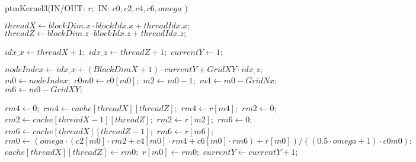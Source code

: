 \documentclass{article}
\begin{document}
	
	\begin{algorithm}
		\caption{ptmKernel3(IN/OUT: $r;$ IN: $c0, c2, c4, c6, omega$ )}\label{alg:ptmKernel3}
		\begin{algorithmic}[1]
	
		\State $threadX \gets blockDim.x \cdot blockIdx.x + threadIdx.x;$		
		\State $threadZ \gets blockDim.z \cdot blockIdx.z + threadIdx.z;$		
				
		\State $idx \_ x \gets threadX  + 1;$		
		\State $idx \_ z \gets threadZ  + 1;$		
		\State $currentY \gets 1;$
		
			\State $nodeIndex \gets idx \_ x + (BlockDimX + 1) \cdot currentY + GridXY \cdot idx \_ z;$
			\State $m0 \gets nodeIndex;$
			\State $c0m0 \gets c0[m0];$
			     \State $m2 \gets m0 - 1;$
			     \State $m4 \gets m0 - GridNx;$
			     \State $m6 \gets m0 - GridXY;$
			     
			     \State $rm4 \gets 0;$
			     \State $rm4 \gets cache[threadX][threadZ];$
			     \Else 			     
			     \State $rm4 \gets r[m4];$
			     \EndIf
			     \State $rm2 \gets 0;$    
			     \State $rm2 \gets cache[threadX - 1][threadZ];$
			     \Else
			     \State $rm2 \gets r[m2];$
			     \EndIf	
			     \State $rm6 \gets 0;$
			     \State $rm6 \gets cache[threadX][threadZ - 1];$
			     \Else
			     \State $rm6 \gets r[m6];$
			     \EndIf
			     \State $rm0 \gets (omega \cdot (c2[m0] \cdot rm2 + c4[m0] \cdot rm4 + c6[m0] \cdot rm6) + r[m0]) / ((0.5 \cdot omega + 1) \cdot c0m0);$
			     \State $cache[threadX][threadZ] \gets rm0;$
			     \State $r[m0] \gets rm0;$			     		   
			  \EndIf
			  \State $currentY \gets currentY + 1 ;$   
		\EndIf	     		     
		\EndFor
		
		
			
			
			
			
			
		\end{algorithmic}
	\end{algorithm}
	
	
\end{document}
